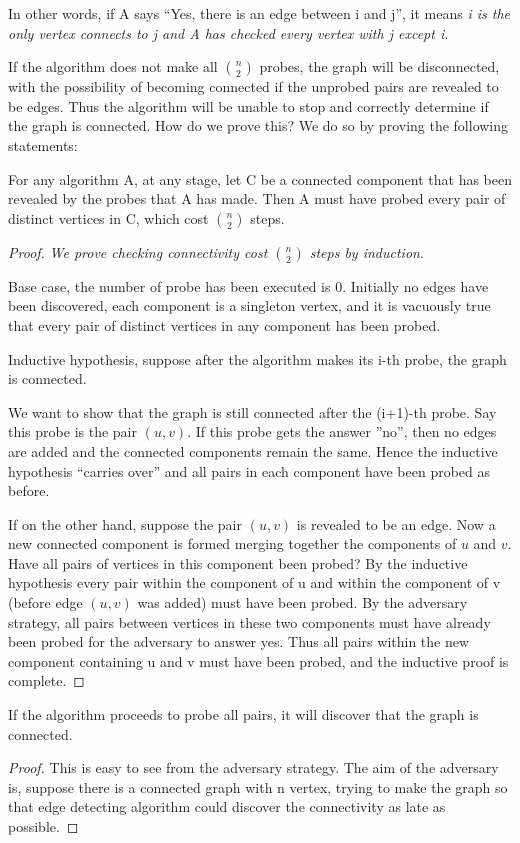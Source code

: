 \documentclass[en,hazy,blue,screen,14pt]{elegantnote}
\begin{document}
In other words, if A says ``Yes, there is an edge between i and j'',
it means\emph{ i is the only vertex connects to j and A has checked
every vertex with j except i.}

If the algorithm does not make all $\binom{n}{2}$ probes, the 
graph
will be disconnected, with the possibility of becoming connected if
the unprobed pairs are revealed to be edges. Thus the algorithm will
be unable to stop and correctly determine if the graph is connected.
How do we prove this? We do so by proving the following statements: 
\begin{lemma}
For any algorithm A, at any stage, let C be a connected component
that has been revealed by the probes that A has made. Then A must
have probed every pair of distinct vertices in C, which cost $\binom{n}{2}$
steps.
\end{lemma}
\begin{proof}
\emph{We prove checking connectivity cost $\binom{n}{2}$ steps by
induction}. 

Base case, the number of probe has been executed is 0. Initially no
edges have been discovered, each component is a singleton vertex,
and it is vacuously true that every pair of distinct vertices in any
component has been probed. 

Inductive hypothesis, suppose after the algorithm makes its i-th probe,
the graph is connected.

We want to show that the graph is still connected after the (i+1)-th
probe. Say this probe is the pair $(u,v)$. If this probe gets the
answer \textquotedblright no\textquotedblright , then no edges are
added and the connected components remain the same. Hence the inductive
hypothesis ``carries over\textquotedblright{} and all pairs in each
component have been probed as before. 

If on the other hand, suppose the pair $(u,v)$ is revealed to be
an edge. Now a new connected component is formed merging together
the components of $u$ and $v$. Have all pairs of vertices in this
component been probed? By the inductive hypothesis every pair within
the component of u and within the component of v (before edge $(u,v)$
was added) must have been probed. By the adversary strategy, all pairs
between vertices in these two components must have already been probed
for the adversary to answer yes. Thus all pairs within the new component
containing u and v must have been probed, and the inductive proof
is complete. 
\end{proof}
\begin{lemma}
If the algorithm proceeds to probe all pairs, it will discover that
the graph is connected. 
\end{lemma}
\begin{proof}
This is easy to see from the adversary strategy. The aim of the adversary
is, suppose there is a connected graph with n vertex, trying to make
the graph so that edge detecting algorithm could discover the connectivity
as late as possible.
\end{proof}
\end{document}
